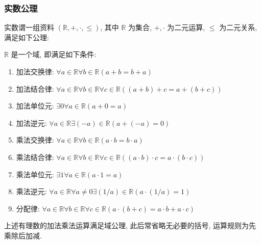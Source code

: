\subsubsection{实数公理}

实数谓一组资料 \((\mathbb{R},+,\cdot,\le)\), 其中 \(\mathbb{R}\) 为集合, \(+,\cdot\) 为二元运算, \(\le\) 为二元关系, 满足如下公理:

\begin{axiom}[域公理]
    \label {axiom:real numbers axiom of field}
    \(\mathbb{R}\) 是一个域, 即满足如下条件:
    \begin{enumerate}
        \item 加法交换律: \(\forall a \in \mathbb{R} \forall b \in \mathbb{R} (a + b = b + a)\)
        \item 加法结合律: \(\forall a \in \mathbb{R} \forall b \in \mathbb{R} \forall c \in \mathbb{R} ((a + b) + c = a + (b + c))\)
        \item 加法单位元: \(\exists 0 \forall a \in \mathbb{R} (a + 0 = a)\)
        \item 加法逆元: \(\forall a \in \mathbb{R} \exists (-a) \in \mathbb{R} (a + (-a) = 0)\)
        \item 乘法交换律: \(\forall a \in \mathbb{R} \forall b \in \mathbb{R} (a \cdot b = b \cdot a)\)
        \item 乘法结合律: \(\forall a \in \mathbb{R} \forall b \in \mathbb{R} \forall c \in \mathbb{R} ((a \cdot b) \cdot c = a \cdot (b \cdot c))\)
        \item 乘法单位元: \(\exists 1 \forall a \in \mathbb{R} (a \cdot 1 = a)\)
        \item 乘法逆元: \(\forall a \in \mathbb{R} \forall a \neq 0 \exists (1/a) \in \mathbb{R} (a \cdot (1/a) = 1)\)
        \item 分配律: \(\forall a \in \mathbb{R} \forall b \in \mathbb{R} \forall c \in \mathbb{R} (a \cdot (b + c) = a \cdot b + a \cdot c)\)
    \end{enumerate}
\end{axiom}

上述有理数的加法乘法运算满足域公理, 此后常省略无必要的括号, 运算规则为先乘除后加减.

